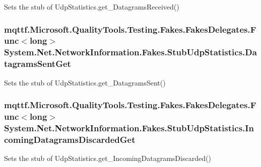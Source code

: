 Sets the stub of Udp\-Statistics.\-get\-\_\-\-Datagrams\-Received()

\hypertarget{class_system_1_1_net_1_1_network_information_1_1_fakes_1_1_stub_udp_statistics_aefa5e5d557004a2c75a0ae493a60ba01}{
\subsubsection[{Datagrams\-Sent\-Get}]{\setlength{\rightskip}{0pt plus 5cm}mqttf.\-Microsoft.\-Quality\-Tools.\-Testing.\-Fakes.\-Fakes\-Delegates.\-Func$<$long$>$ System.\-Net.\-Network\-Information.\-Fakes.\-Stub\-Udp\-Statistics.\-Datagrams\-Sent\-Get}}\label{class_system_1_1_net_1_1_network_information_1_1_fakes_1_1_stub_udp_statistics_aefa5e5d557004a2c75a0ae493a60ba01}


Sets the stub of Udp\-Statistics.\-get\-\_\-\-Datagrams\-Sent()

\hypertarget{class_system_1_1_net_1_1_network_information_1_1_fakes_1_1_stub_udp_statistics_a8885d7648caeada6adc5d91104d1dc21}{
\subsubsection[{Incoming\-Datagrams\-Discarded\-Get}]{\setlength{\rightskip}{0pt plus 5cm}mqttf.\-Microsoft.\-Quality\-Tools.\-Testing.\-Fakes.\-Fakes\-Delegates.\-Func$<$long$>$ System.\-Net.\-Network\-Information.\-Fakes.\-Stub\-Udp\-Statistics.\-Incoming\-Datagrams\-Discarded\-Get}}\label{class_system_1_1_net_1_1_network_information_1_1_fakes_1_1_stub_udp_statistics_a8885d7648caeada6adc5d91104d1dc21}


Sets the stub of Udp\-Statistics.\-get\-\_\-\-Incoming\-Datagrams\-Discarded()

